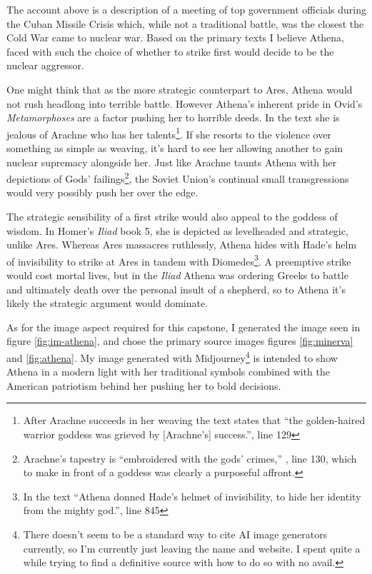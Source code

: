 \documentclass[letterpaper, reqno,11pt]{article}
\begin{document}
The account above is a description of a meeting of top government officials during the Cuban Missile Crisis which, while not a traditional battle, was the closest the Cold War came to nuclear war. Based on the primary texts I believe Athena, faced with such the choice of whether to strike first would decide to be the nuclear aggressor.

One might think that as the more strategic counterpart to Ares, Athena would not rush headlong into terrible battle. However Athena's inherent pride in Ovid's {\em Metamorphoses}\autocite{ovid} are a factor pushing her to horrible deeds. In the text she is jealous of Arachne who has her talents\footnote{After Arachne succeeds in her weaving the text states that ``the golden-haired warrior goddess was grieved by [Arachne's] success.''\parencite{ovid}, line 129}. If she resorts to the violence over something as simple as weaving, it's hard to see her allowing another to gain nuclear supremacy alongside her. Just like Arachne taunts Athena with her depictions of Gods' failings\footnote{Arachne's tapestry is ``embroidered with the gods' crimes,'' \parencite{ovid}, line 130, which to make in front of a goddess was clearly a purposeful affront.}, the Soviet Union's continual small transgressions would very possibly push her over the edge.

The strategic sensibility of a first strike would also appeal to the goddess of wisdom. In Homer's {\em Iliad} book 5\autocite{homer}, she is depicted as levelheaded and strategic, unlike Ares. Whereas Ares massacres ruthlessly, Athena hides with Hade's helm of invisibility to strike at Ares in tandem with Diomedes\footnote{In the text ``Athena donned Hade's helmet of invisibility, to hide her identity from the mighty god.''\parencite{homer}, line 845}. A preemptive strike would cost mortal lives, but in the {\em Iliad} Athena was ordering Greeks to battle and ultimately death over the personal insult of a shepherd, so to Athena it's likely the strategic argument would dominate. 

As for the image aspect required for this capstone, I generated the image seen in figure \ref{fig:im-athena}, and chose the primary source images figures \ref{fig:minerva}\autocite{minerva} and \ref{fig:athena}\autocite{poseidon}. My image generated with Midjourney\autocite{midjourney}\footnote{There doesn't seem to be a standard way to cite AI image generators currently, so I'm currently just leaving the name and website. I spent quite a while trying to find a definitive source with how to do so with no avail. } is intended to show Athena in a modern light with her traditional symbols combined with the American patriotism behind her pushing her to bold decisions. 
\end{document}
